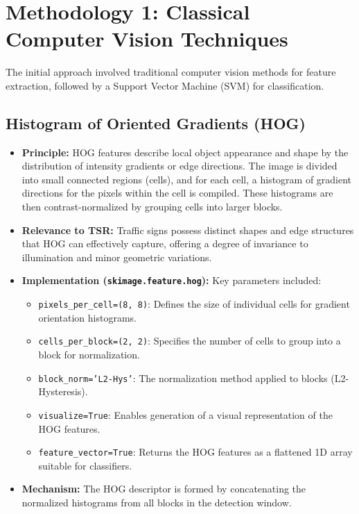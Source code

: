 \documentclass[11pt, a4paper]{article}
\begin{document}
\section{Methodology 1: Classical Computer Vision Techniques}
The initial approach involved traditional computer vision methods for feature extraction, followed by a Support Vector Machine (SVM) for classification.

\subsection{Histogram of Oriented Gradients (HOG)}
\begin{itemize}
    \item \textbf{Principle:} HOG features describe local object appearance and shape by the distribution of intensity gradients or edge directions. The image is divided into small connected regions (cells), and for each cell, a histogram of gradient directions for the pixels within the cell is compiled. These histograms are then contrast-normalized by grouping cells into larger blocks.
    \item \textbf{Relevance to TSR:} Traffic signs possess distinct shapes and edge structures that HOG can effectively capture, offering a degree of invariance to illumination and minor geometric variations.
    \item \textbf{Implementation (\texttt{skimage.feature.hog}):}
        Key parameters included:
        \begin{itemize}
            \item \texttt{pixels\_per\_cell=(8, 8)}: Defines the size of individual cells for gradient orientation histograms.
            \item \texttt{cells\_per\_block=(2, 2)}: Specifies the number of cells to group into a block for normalization.
            \item \texttt{block\_norm='L2-Hys'}: The normalization method applied to blocks (L2-Hysteresis).
            \item \texttt{visualize=True}: Enables generation of a visual representation of the HOG features.
            \item \texttt{feature\_vector=True}: Returns the HOG features as a flattened 1D array suitable for classifiers.
        \end{itemize}
    \item \textbf{Mechanism:} The HOG descriptor is formed by concatenating the normalized histograms from all blocks in the detection window.
\end{itemize}
\end{document}
